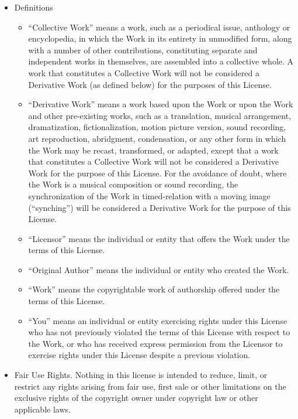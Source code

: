 \documentclass{article}
\begin{document}
\begin{itemize} \item Definitions

\begin{itemize} \item ``Collective Work'' means a work, such as a
periodical issue, anthology or encyclopedia, in which the Work in its
entirety in unmodified form, along with a number of other
contributions, constituting separate and independent works in
themselves, are assembled into a collective whole.  A work that
constitutes a Collective Work will not be considered a Derivative Work
(as defined below) for the purposes of this License.

\item ``Derivative Work'' means a work based upon the Work or upon the
Work and other pre-existing works, such as a translation, musical
arrangement, dramatization, fictionalization, motion picture version,
sound recording, art reproduction, abridgment, condensation, or any
other form in which the Work may be recast, transformed, or adapted,
except that a work that constitutes a Collective Work will not be
considered a Derivative Work for the purpose of this License.  For the
avoidance of doubt, where the Work is a musical composition or sound
recording, the synchronization of the Work in timed-relation with a
moving image (``synching'') will be considered a Derivative Work for
the purpose of this License.

\item ``Licensor'' means the individual or entity that offers the Work
under the terms of this License.

\item ``Original Author'' means the individual or entity who created
the Work.

\item ``Work'' means the copyrightable work of authorship offered under
the terms of this License.

\item ``You'' means an individual or entity exercising rights under
this License who has not previously violated the terms of this License
with respect to the Work, or who has received express permission from
the Licensor to exercise rights under this License despite a previous
violation.  \end{itemize}

\item Fair Use Rights.  Nothing in this license is intended to reduce,
limit, or restrict any rights arising from fair use, first sale or
other limitations on the exclusive rights of the copyright owner under
copyright law or other applicable laws.


\end{itemize}
\end{document}
